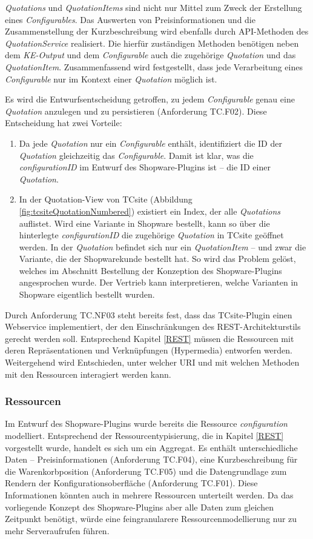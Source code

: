 \documentclass[11pt, a4paper, titlepage, listof=totoc, bibliography=totoc, index=totoc, twoside, openright, headings=normal, draft]{scrreprt}
\begin{document}
\emph{Quotations} und \emph{QuotationItems} sind nicht nur Mittel zum Zweck der Erstellung eines \emph{Configurables}. Das Auswerten von Preisinformationen und die Zusammenstellung der Kurzbeschreibung wird ebenfalls durch API-Methoden des \emph{QuotationService} realisiert. Die hierfür zuständigen Methoden benötigen neben dem \emph{KE-Output} und dem \emph{Configurable} auch die zugehörige \emph{Quotation} und das \emph{QuotationItem}. Zusammenfassend wird festgestellt, dass jede Verarbeitung eines \emph{Configurable} nur im Kontext einer \emph{Quotation} möglich ist.

Es wird die Entwurfsentscheidung getroffen, zu jedem \emph{Configurable} genau eine \emph{Quotation} anzulegen und zu persistieren (Anforderung TC.F02). Diese Entscheidung hat zwei Vorteile:
\begin{enumerate}
\item Da jede \emph{Quotation} nur ein \emph{Configurable} enthält, identifiziert die ID der \emph{Quotation} gleichzeitig das \emph{Configurable}. Damit ist klar, was die \emph{configurationID} im Entwurf des Shopware-Plugins ist -- die ID einer \emph{Quotation}.
\item In der Quotation-View von TCsite (Abbildung \ref{fig:tcsiteQuotationNumbered}) existiert ein Index, der alle \emph{Quotations} auflistet. Wird eine Variante in Shopware bestellt, kann so über die hinterlegte \emph{configurationID} die zugehörige \emph{Quotation} in TCsite geöffnet werden. In der \emph{Quotation} befindet sich nur ein \emph{QuotationItem} -- und zwar die Variante, die der Shopwarekunde bestellt hat. So wird das Problem gelöst, welches im Abschnitt \glqq Bestellung\grqq{} der Konzeption des Shopware-Plugins angesprochen wurde. Der Vertrieb kann interpretieren, welche Varianten in Shopware eigentlich bestellt wurden.
\end{enumerate}

Durch Anforderung TC.NF03 steht bereits fest, dass das TCsite-Plugin einen Webservice implementiert, der den Einschränkungen des REST-Architekturstils gerecht werden soll. Entsprechend Kapitel \ref{REST} müssen die Ressourcen mit deren Repräsentationen und Verknüpfungen (Hypermedia) entworfen werden. Weitergehend wird Entschieden, unter welcher URI und mit welchen Methoden mit den Ressourcen interagiert werden kann.

\subsubsection{Ressourcen}
Im Entwurf des Shopware-Plugins wurde bereits die Ressource \emph{configuration} modelliert. Entsprechend der Ressourcentypisierung, die in Kapitel \ref{REST} vorgestellt wurde, handelt es sich um ein Aggregat. Es enthält unterschiedliche Daten -- Preisinformationen (Anforderung TC.F04), eine Kurzbeschreibung für die Warenkorbposition (Anforderung TC.F05) und die Datengrundlage zum Rendern der Konfigurationsoberfläche (Anforderung TC.F01). Diese Informationen könnten auch in mehrere Ressourcen unterteilt werden. Da das vorliegende Konzept des Shopware-Plugins aber alle Daten zum gleichen Zeitpunkt benötigt, würde eine feingranularere Ressourcenmodellierung nur zu mehr Serveraufrufen führen.
\end{document}
